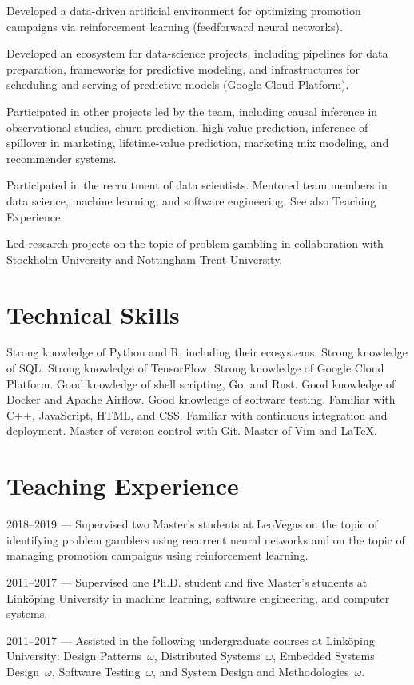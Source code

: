 \documentclass[journal]{IEEEtran}
\begin{document}
Developed a data-driven artificial environment for optimizing promotion
campaigns via reinforcement learning (feedforward neural networks).

Developed an ecosystem for data-science projects, including pipelines for data
preparation, frameworks for predictive modeling, and infrastructures for
scheduling and serving of predictive models (Google Cloud Platform).

Participated in other projects led by the team, including causal inference in
observational studies, churn prediction, high-value prediction, inference of
spillover in marketing, lifetime-value prediction, marketing mix modeling, and
recommender systems.

Participated in the recruitment of data scientists. Mentored team members in
data science, machine learning, and software engineering. See also Teaching
Experience.

Led research projects on the topic of problem gambling in collaboration with
Stockholm University and Nottingham Trent University.

\section{Technical Skills}
Strong knowledge of Python and R, including their ecosystems. Strong knowledge
of SQL. Strong knowledge of TensorFlow. Strong knowledge of Google Cloud
Platform. Good knowledge of shell scripting, Go, and Rust. Good knowledge of
Docker and Apache Airflow. Good knowledge of software testing. Familiar with
C++, JavaScript, HTML, and CSS. Familiar with continuous integration and
deployment. Master of version control with Git. Master of Vim and LaTeX.

\section{Teaching Experience}
2018--2019 --- Supervised two Master's students at LeoVegas on the topic of
identifying problem gamblers using recurrent neural networks and on the topic
of managing promotion campaigns using reinforcement learning.

2011--2017 --- Supervised one Ph.D. student and five Master's students at
Linköping University in machine learning, software engineering, and computer
systems.

2011--2017 --- Assisted in the following undergraduate courses at Linköping
University: Design Patterns~$\omega$, Distributed Systems~$\omega$, Embedded
Systems Design~$\omega$, Software Testing~$\omega$, and System Design and
Methodologies~$\omega$.
\end{document}
